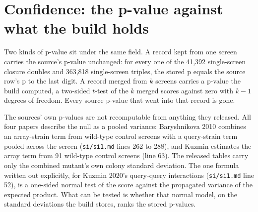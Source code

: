 
\section{Confidence: the p-value against what the build holds}
\label{sec:confidence}

Two kinds of p-value sit under the same field. A record kept from one screen carries
the source's p-value unchanged: for every one of the 41{,}392 single-screen closure
doubles and 363{,}818 single-screen triples, the stored p equals the source row's p
to the last digit. A record merged from $k$ screens carries a p-value the build
computed, a two-sided $t$-test of the $k$ merged scores against zero with $k-1$
degrees of freedom. Every source p-value that went into that record is gone.

The sources' own p-values are not recomputable from anything they released. All four
papers describe the null as a pooled variance: Baryshnikova 2010 combines an
array-strain term from wild-type control screens with a query-strain term pooled
across the screen (\texttt{si/si1.md} lines 262 to 288), and Kuzmin estimates the
array term from 91 wild-type control screens (line 63). The released tables carry only
the combined mutant's own colony standard deviation. The one formula written out
explicitly, for Kuzmin 2020's query-query interactions (\texttt{si/si1.md} line 52),
is a one-sided normal test of the score against the propagated variance of the
expected product. What can be tested is whether that normal model, on the standard
deviations the build stores, ranks the stored p-values.


